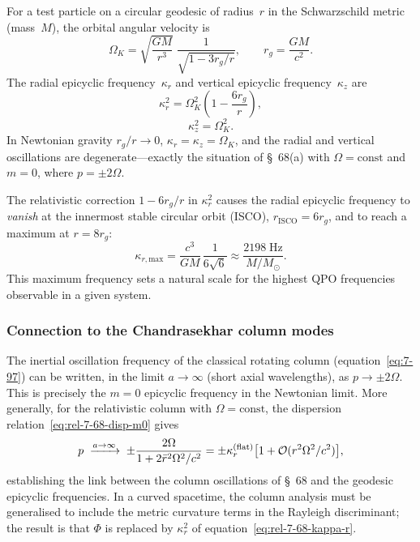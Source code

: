 For a test particle on a circular geodesic of radius~$r$ in the
Schwarzschild metric (mass~$M$), the orbital angular velocity is
\begin{equation}
\label{eq:rel-7-68-OmegaK}
\Omega_K = \sqrt{\frac{GM}{r^3}}\;\frac{1}{\sqrt{1-3r_g/r}},
\qquad r_g = \frac{GM}{c^2}.
\end{equation}
The radial epicyclic frequency~$\kappa_r$ and vertical epicyclic
frequency~$\kappa_z$ are
\begin{equation}
\label{eq:rel-7-68-kappa-r}
\kappa_r^2 = \Omega_K^2\!\left(1 - \frac{6r_g}{r}\right),
\end{equation}
\begin{equation}
\label{eq:rel-7-68-kappa-z}
\kappa_z^2 = \Omega_K^2.
\end{equation}
In Newtonian gravity $r_g/r \to 0$, $\kappa_r = \kappa_z = \Omega_K$,
and the radial and vertical oscillations are degenerate---exactly the
situation of \S~68(a) with $\Omega = \text{const}$ and $m=0$, where
$p = \pm 2\Omega$.

The relativistic correction $1 - 6r_g/r$ in $\kappa_r^2$ causes the
radial epicyclic frequency to \emph{vanish} at the innermost stable
circular orbit (ISCO), $r_{\mathrm{ISCO}} = 6r_g$, and to reach a
maximum at $r = 8r_g$:
\begin{equation}
\label{eq:rel-7-68-kappa-max}
\kappa_{r,\mathrm{max}}
= \frac{c^3}{GM}\,\frac{1}{6\sqrt{6}}
\approx \frac{2198\;\mathrm{Hz}}{M/M_\odot}.
\end{equation}
This maximum frequency sets a natural scale for the highest QPO
frequencies observable in a given system.

\subsubsection{Connection to the Chandrasekhar column modes}

The inertial oscillation frequency of the classical rotating column
(equation~\eqref{eq:7-97}) can be written, in the limit
$a \to \infty$ (short axial wavelengths), as $p \to \pm 2\Omega$.
This is precisely the $m=0$ epicyclic frequency in the Newtonian limit.
More generally, for the relativistic column with $\Omega = \text{const}$,
the dispersion relation~\eqref{eq:rel-7-68-disp-m0} gives
\begin{equation}
\label{eq:rel-7-68-column-epi}
p \;\xrightarrow{a\to\infty}\;
\pm\frac{2\Omega}{1 + 2\bar{r}^2\Omega^2/c^2}
= \pm\kappa_r^{\mathrm{(flat)}}\bigl[1 + \mathcal{O}(r^2\Omega^2/c^2)\bigr],
\end{equation}
establishing the link between the column oscillations of \S~68 and
the geodesic epicyclic frequencies.  In a curved spacetime, the column
analysis must be generalised to include the metric curvature
terms in the Rayleigh discriminant; the result is that $\Phi$ is
replaced by $\kappa_r^2$ of equation~\eqref{eq:rel-7-68-kappa-r}.

